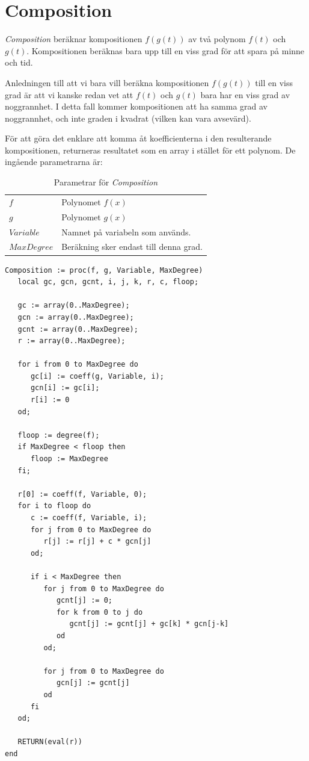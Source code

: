 \section{Composition}

\emph{Composition} beräknar kompositionen $f(g(t))$ av två polynom $f(t)$ och $g(t)$. Kompositionen beräknas bara upp till en viss grad för att spara på minne och tid.

Anledningen till att vi bara vill beräkna kompositionen $f(g(t))$ till en viss grad är att vi kanske redan vet att $f(t)$ och $g(t)$ bara har en viss grad av noggrannhet. I detta fall kommer kompositionen att ha samma grad av noggrannhet, och inte graden i kvadrat (vilken kan vara avsevärd).

För att göra det enklare att komma åt koefficienterna i den resulterande kompositionen, returneras resultatet som en array i stället för ett polynom. De ingående parametrarna är:

\begin{table}[h]
\caption{Parametrar för \emph{Composition}}
\begin{center}
\begin{tabular}{|l|l|}
\hline
$f$ & Polynomet $f(x)$ \\
$g$ & Polynomet $g(x)$ \\
$Variable$ & Namnet på variabeln som används. \\
$MaxDegree$ & Beräkning sker endast till denna grad. \\
\hline
\end{tabular}
\end{center}
\end{table}

\begin{verbatim}
Composition := proc(f, g, Variable, MaxDegree)
   local gc, gcn, gcnt, i, j, k, r, c, floop;

   gc := array(0..MaxDegree);
   gcn := array(0..MaxDegree);
   gcnt := array(0..MaxDegree);
   r := array(0..MaxDegree);

   for i from 0 to MaxDegree do
      gc[i] := coeff(g, Variable, i); 
      gcn[i] := gc[i]; 
      r[i] := 0
   od;

   floop := degree(f);
   if MaxDegree < floop then 
      floop := MaxDegree 
   fi;

   r[0] := coeff(f, Variable, 0);
   for i to floop do
      c := coeff(f, Variable, i);
      for j from 0 to MaxDegree do 
         r[j] := r[j] + c * gcn[j] 
      od;

      if i < MaxDegree then
         for j from 0 to MaxDegree do
            gcnt[j] := 0; 
            for k from 0 to j do
               gcnt[j] := gcnt[j] + gc[k] * gcn[j-k]
            od
         od;

         for j from 0 to MaxDegree do 
            gcn[j] := gcnt[j] 
         od
      fi
   od;

   RETURN(eval(r))
end
\end{verbatim}

